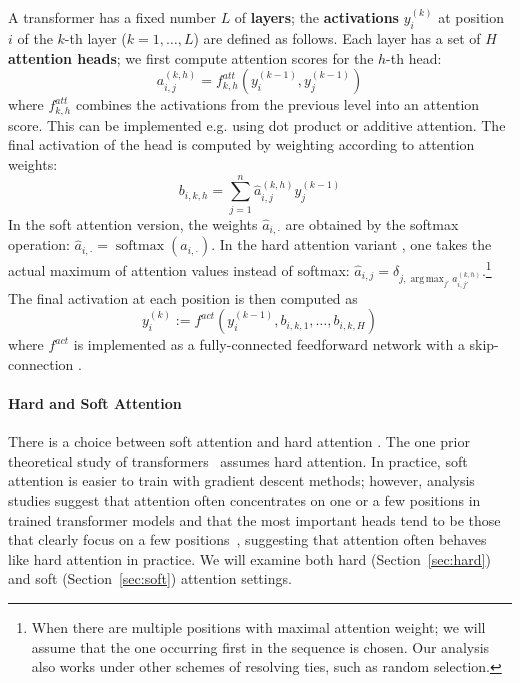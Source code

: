 \documentclass[11pt,a4paper]{article}
\DeclareMathOperator*{\argmax}{arg\,max}
\newcommand{\key}[1]{\textbf{#1}}
\begin{document}
A transformer has a fixed number $L$ of \key{layers}; the \key{activations} $y_i^{(k)}$ at position $i$ of the $k$-th layer ($k=1, \dots, L$) are defined as follows.
Each layer has a set of $H$ \key{attention heads}; we first compute attention scores for the $h$-th head:
\begin{equation}
    a_{i,j}^{(k,h)} = f^{att}_{k,h}\left(y_i^{(k-1)}, y_j^{(k-1)}\right)
\end{equation}
where $f^{att}_{k,h}$ combines the activations from the previous level into an attention score.
This can be implemented e.g. using dot product or additive attention.
The final activation of the head is computed by weighting according to attention weights:
\begin{equation}
    b_{i,k,h} = \sum_{j=1}^n \hat{a}_{i,j}^{(k,h)} y_j^{(k-1)}
\end{equation}
In the soft attention version, the weights $\hat{a}_{i,\cdot}$ are obtained by the softmax operation: $\hat{a}_{i,\cdot} = \operatorname{softmax}(a_{i,\cdot})$.
In the hard attention variant \cite{perez2019turing}, one takes the actual maximum of attention values instead of softmax:
$\hat{a}_{i,j} = \delta_{j, \argmax_{j'} a_{i,j'}^{(k,h)}}$.\footnote{When there are multiple positions with maximal attention weight; we will assume that the one occurring first in the sequence is chosen. Our analysis also works under other schemes of resolving ties, such as random selection.}
The final activation at each position is then computed as
\begin{equation}
    y_i^{(k)} := f^{act}(y_i^{(k-1)}, b_{i,k,1}, \dots, b_{i,k,H})
\end{equation}
where $f^{act}$ is implemented as a fully-connected feedforward network with a skip-connection \cite{vaswani2017attention}.

\paragraph{Hard and Soft Attention}
There is a choice between soft attention and hard attention \cite{shen2018reinforced,perez2019turing}.
The one prior theoretical study of transformers~\cite{perez2019turing} assumes hard attention.
In practice, soft attention is easier to train with gradient descent methods; however, analysis studies suggest that attention often concentrates on one or a few positions in trained transformer models \cite{voita2019analyzing,clark2019bert} and that the most important heads tend to be those that clearly focus on a few positions~\cite{voita2019analyzing}, suggesting that attention often behaves  like hard attention in practice. %
We will  examine both hard (Section~\ref{sec:hard}) and soft (Section~\ref{sec:soft}) attention settings.
\end{document}
